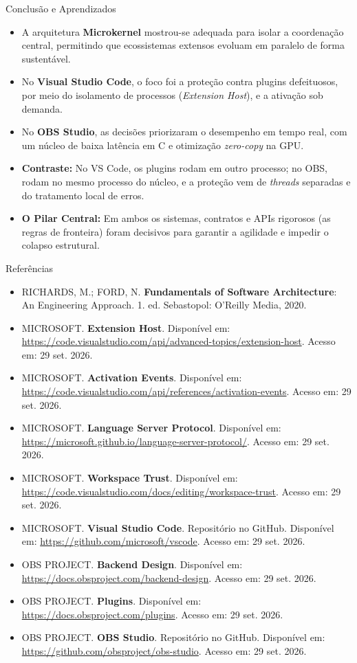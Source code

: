 \documentclass[aspectratio=169]{beamer}
\begin{document}
\begin{frame}{Conclusão e Aprendizados}
\begin{itemize}\setlength{\itemsep}{0.6em}
\item A arquitetura \textbf{Microkernel} mostrou-se adequada para isolar a coordenação central, permitindo que ecossistemas extensos evoluam em paralelo de forma sustentável.
\item No \textbf{Visual Studio Code}, o foco foi a proteção contra plugins defeituosos, por meio do isolamento de processos (\textit{Extension Host}), e a ativação sob demanda.
\item No \textbf{OBS Studio}, as decisões priorizaram o desempenho em tempo real, com um núcleo de baixa latência em C e otimização \textit{zero-copy} na GPU.
\item \textbf{Contraste:} No VS Code, os plugins rodam em outro processo; no OBS, rodam no mesmo processo do núcleo, e a proteção vem de \textit{threads} separadas e do tratamento local de erros.
\item \textbf{O Pilar Central:} Em ambos os sistemas, contratos e APIs rigorosos (as regras de fronteira) foram decisivos para garantir a agilidade e impedir o colapso estrutural.
\end{itemize}
\end{frame}

\begin{frame}{Referências}
\scriptsize
\begin{itemize}\setlength{\itemsep}{0.3em}
\item RICHARDS, M.; FORD, N. \textbf{Fundamentals of Software Architecture}: An Engineering Approach. 1. ed. Sebastopol: O'Reilly Media, 2020.
\item MICROSOFT. \textbf{Extension Host}. Disponível em: \url{https://code.visualstudio.com/api/advanced-topics/extension-host}. Acesso em: 29 set. 2026.
\item MICROSOFT. \textbf{Activation Events}. Disponível em: \url{https://code.visualstudio.com/api/references/activation-events}. Acesso em: 29 set. 2026.
\item MICROSOFT. \textbf{Language Server Protocol}. Disponível em: \url{https://microsoft.github.io/language-server-protocol/}. Acesso em: 29 set. 2026.
\item MICROSOFT. \textbf{Workspace Trust}. Disponível em: \url{https://code.visualstudio.com/docs/editing/workspace-trust}. Acesso em: 29 set. 2026.
\item MICROSOFT. \textbf{Visual Studio Code}. Repositório no GitHub. Disponível em: \url{https://github.com/microsoft/vscode}. Acesso em: 29 set. 2026.
\item OBS PROJECT. \textbf{Backend Design}. Disponível em: \url{https://docs.obsproject.com/backend-design}. Acesso em: 29 set. 2026.
\item OBS PROJECT. \textbf{Plugins}. Disponível em: \url{https://docs.obsproject.com/plugins}. Acesso em: 29 set. 2026.
\item OBS PROJECT. \textbf{OBS Studio}. Repositório no GitHub. Disponível em: \url{https://github.com/obsproject/obs-studio}. Acesso em: 29 set. 2026.
\end{itemize}
\end{frame}
\end{document}
